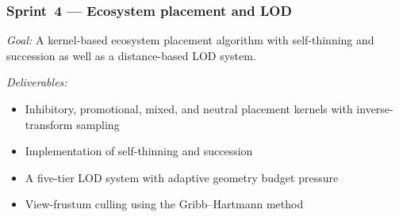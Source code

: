 \subsubsection{Sprint~4 — Ecosystem placement and LOD}
\textit{Goal:} A kernel-based ecosystem placement algorithm with self-thinning and succession as well as a
distance-based LOD system.

\medskip
\textit{Deliverables:}
\begin{itemize}
  \item Inhibitory, promotional, mixed, and neutral placement kernels with inverse-transform sampling
  \item Implementation of self-thinning and succession
  \item A five-tier LOD system with adaptive geometry budget pressure
  \item View-frustum culling using the Gribb--Hartmann method~\cite{gribbFastExtractionViewing}
\end{itemize}
